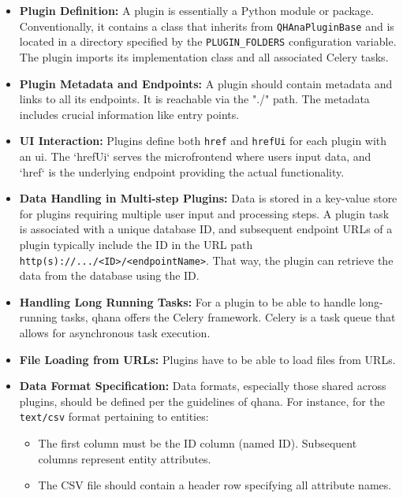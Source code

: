 \documentclass[
  a4paper,  %
  twoside,  %
  bibliography=totoc,
  headsepline,
  cleardoublepage=empty,
  parskip=half,
  draft=false
]{scrbook}
\begin{document}
\begin{itemize}
    \item \textbf{Plugin Definition:}
    A plugin is essentially a Python module or package.
    Conventionally, it contains a class that inherits from \texttt{QHAnaPluginBase} and is located in a directory specified by the \texttt{PLUGIN\_FOLDERS} configuration variable.
    The plugin imports its implementation class and all associated Celery tasks.

    \item \textbf{Plugin Metadata and Endpoints:}
    A plugin should contain metadata and links to all its endpoints. It is reachable via the "./" path.
    The metadata includes crucial information like entry points.

    \item \textbf{UI Interaction:}
    Plugins define both \texttt{href} and \texttt{hrefUi} for each plugin with an \gls{ui}.
    The `hrefUi` serves the microfrontend where users input data, and `href` is the underlying endpoint providing the actual functionality.

    \item \textbf{Data Handling in Multi-step Plugins:}
    Data is stored in a key-value store for plugins requiring multiple user input and processing steps.
    A plugin task is associated with a unique database ID, and subsequent endpoint URLs of a plugin typically include the ID in the URL path \texttt{http(s)://.../<ID>/<endpointName>}.
    That way, the plugin can retrieve the data from the database using the ID.

    \item \textbf{Handling Long Running Tasks:}
    For a plugin to be able to handle long-running tasks, \gls{qhana} offers the Celery framework.
    Celery is a task queue that allows for asynchronous task execution.

    \item \textbf{File Loading from URLs:}
    Plugins have to be able to load files from URLs.

    \item \textbf{Data Format Specification:}
    Data formats, especially those shared across plugins, should be defined per the guidelines of \gls{qhana}.
    For instance, for the \texttt{text/csv} format pertaining to entities:
    \begin{itemize}
        \item The first column must be the ID column (named ID). Subsequent columns represent entity attributes.
        \item The CSV file should contain a header row specifying all attribute names.
    \end{itemize}
\end{itemize}
\end{document}
